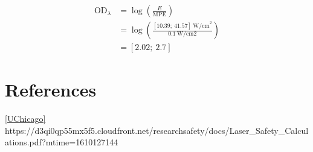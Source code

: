 \documentclass[a4paper]{article}
\begin{document}
\begin{align*}
\textrm{OD}_{\lambda} &= \log\left(\frac{E}{\textrm{MPE}}\right)\\
&= \log\left(\frac{[10.39;\ 41.57]\ \textrm{W/cm}^2}{0.1\ \textrm{W/cm2}}\right)\\
&= [2.02;\ 2.7]
\end{align*}


\section{References}
\ref{UChicago}
https://d3qi0qp55mx5f5.cloudfront.net/researchsafety/docs/Laser\_Safety\_Calculations.pdf?mtime=1610127144 
\end{document}
